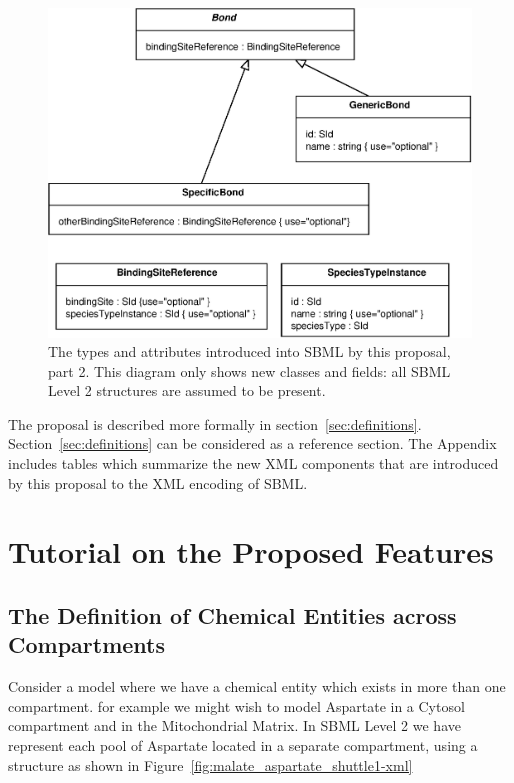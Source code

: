 \documentclass{cekarticle}
\begin{document}
\begin{figure}[h]
  \vspace*{8pt}
  \centering
  \includegraphics[scale = 0.7]{multi-component-species-uml2.eps}
  \caption{The types and attributes introduced into SBML by this proposal, part 2.  This diagram
  only shows new classes and fields: all SBML Level 2 structures are assumed to be present.}
  \label{fig:multi-component-species-uml2s}
\end{figure}

The proposal is described more formally in section~\ref{sec:definitions}.
Section~\ref{sec:definitions} can be considered as a reference section.
The Appendix includes tables which summarize the new XML components that
are introduced by this proposal to the XML encoding of SBML.

\clearpage

\section{Tutorial on the Proposed Features}
\label{sec:tutorial}
\subsection{The Definition of Chemical Entities across Compartments}
\label{sec:commonspecies}

Consider a model where we have a chemical entity which exists in more than one compartment.
for example we might wish to model Aspartate in a Cytosol compartment and in the Mitochondrial Matrix.
In SBML Level 2 we have represent each pool of Aspartate located in a separate compartment, using a
 structure as shown in Figure~\ref{fig:malate_aspartate_shuttle1-xml}
\end{document}

